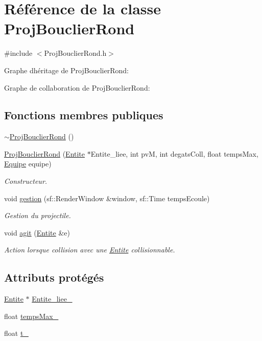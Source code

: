 \hypertarget{class_proj_bouclier_rond}{}\section{Référence de la classe Proj\+Bouclier\+Rond}
\label{class_proj_bouclier_rond}


{\ttfamily \#include $<$Proj\+Bouclier\+Rond.\+h$>$}



Graphe d\textquotesingle{}héritage de Proj\+Bouclier\+Rond\+:


Graphe de collaboration de Proj\+Bouclier\+Rond\+:
\subsection*{Fonctions membres publiques}
\begin{DoxyCompactItemize}
\item 
\hyperlink{class_proj_bouclier_rond_aa202b3155f5f66420ca1c2c66e9252c0}{$\sim$\+Proj\+Bouclier\+Rond} ()
\item 
\hyperlink{class_proj_bouclier_rond_a37c5c67531bbc143d31ecd768dcde161}{Proj\+Bouclier\+Rond} (\hyperlink{class_entite}{Entite} $\ast$Entite\+\_\+liee, int pvM, int degats\+Coll, float temps\+Max, \hyperlink{constantes_8h_a08fa5554288d5031a8f3bb83cc04ee83}{Equipe} equipe)
\begin{DoxyCompactList}\small\item\em Constructeur. \end{DoxyCompactList}\item 
void \hyperlink{class_proj_bouclier_rond_afb4ab627e02e6761c6e99783749ebc89}{gestion} (sf\+::\+Render\+Window \&window, sf\+::\+Time temps\+Ecoule)
\begin{DoxyCompactList}\small\item\em Gestion du projectile. \end{DoxyCompactList}\item 
void \hyperlink{class_proj_bouclier_rond_a60547ae68c6862f6e4c8b9cdd94bb52b}{agit} (\hyperlink{class_entite}{Entite} \&e)
\begin{DoxyCompactList}\small\item\em Action lorsque collision avec une \hyperlink{class_entite}{Entite} collisionnable. \end{DoxyCompactList}\end{DoxyCompactItemize}
\subsection*{Attributs protégés}
\begin{DoxyCompactItemize}
\item 
\hyperlink{class_entite}{Entite} $\ast$ \hyperlink{class_proj_bouclier_rond_a938402512d55df69b5d8dab0bb7a3610}{Entite\+\_\+liee\+\_\+}
\item 
float \hyperlink{class_proj_bouclier_rond_a757b6ab00a692e9cb032c225d75a5bd5}{temps\+Max\+\_\+}
\item 
float \hyperlink{class_proj_bouclier_rond_ad73cbf9d45a74aa45669cac8dba7b940}{t\+\_\+}
\end{DoxyCompactItemize}


